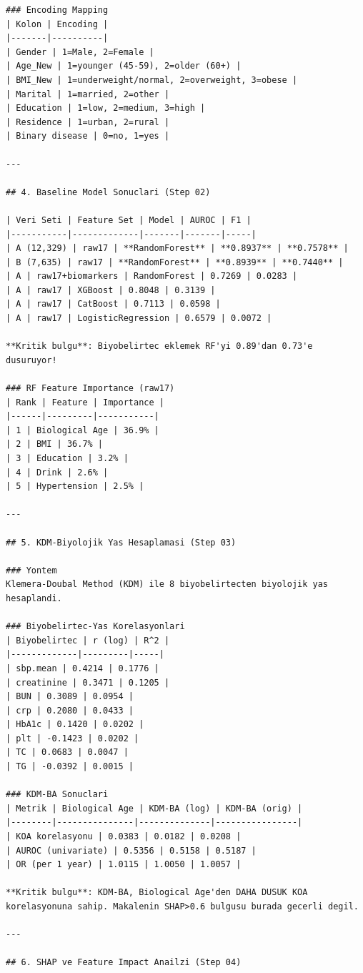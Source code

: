 ﻿\documentclass[11pt,a4paper]{article}
\begin{document}
\begin{verbatim}
### Encoding Mapping
| Kolon | Encoding |
|-------|----------|
| Gender | 1=Male, 2=Female |
| Age_New | 1=younger (45-59), 2=older (60+) |
| BMI_New | 1=underweight/normal, 2=overweight, 3=obese |
| Marital | 1=married, 2=other |
| Education | 1=low, 2=medium, 3=high |
| Residence | 1=urban, 2=rural |
| Binary disease | 0=no, 1=yes |

---

## 4. Baseline Model Sonuclari (Step 02)

| Veri Seti | Feature Set | Model | AUROC | F1 |
|-----------|-------------|-------|-------|-----|
| A (12,329) | raw17 | **RandomForest** | **0.8937** | **0.7578** |
| B (7,635) | raw17 | **RandomForest** | **0.8939** | **0.7440** |
| A | raw17+biomarkers | RandomForest | 0.7269 | 0.0283 |
| A | raw17 | XGBoost | 0.8048 | 0.3139 |
| A | raw17 | CatBoost | 0.7113 | 0.0598 |
| A | raw17 | LogisticRegression | 0.6579 | 0.0072 |

**Kritik bulgu**: Biyobelirtec eklemek RF'yi 0.89'dan 0.73'e dusuruyor!

### RF Feature Importance (raw17)
| Rank | Feature | Importance |
|------|---------|-----------|
| 1 | Biological Age | 36.9% |
| 2 | BMI | 36.7% |
| 3 | Education | 3.2% |
| 4 | Drink | 2.6% |
| 5 | Hypertension | 2.5% |

---

## 5. KDM-Biyolojik Yas Hesaplamasi (Step 03)

### Yontem
Klemera-Doubal Method (KDM) ile 8 biyobelirtecten biyolojik yas hesaplandi.

### Biyobelirtec-Yas Korelasyonlari
| Biyobelirtec | r (log) | R^2 |
|-------------|---------|-----|
| sbp.mean | 0.4214 | 0.1776 |
| creatinine | 0.3471 | 0.1205 |
| BUN | 0.3089 | 0.0954 |
| crp | 0.2080 | 0.0433 |
| HbA1c | 0.1420 | 0.0202 |
| plt | -0.1423 | 0.0202 |
| TC | 0.0683 | 0.0047 |
| TG | -0.0392 | 0.0015 |

### KDM-BA Sonuclari
| Metrik | Biological Age | KDM-BA (log) | KDM-BA (orig) |
|--------|---------------|--------------|----------------|
| KOA korelasyonu | 0.0383 | 0.0182 | 0.0208 |
| AUROC (univariate) | 0.5356 | 0.5158 | 0.5187 |
| OR (per 1 year) | 1.0115 | 1.0050 | 1.0057 |

**Kritik bulgu**: KDM-BA, Biological Age'den DAHA DUSUK KOA korelasyonuna sahip. Makalenin SHAP>0.6 bulgusu burada gecerli degil.

---

## 6. SHAP ve Feature Impact Anailzi (Step 04)


\end{verbatim}
\end{document}
